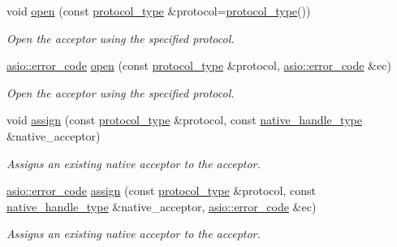 \begin{DoxyCompactItemize}
void \hyperlink{classasio_1_1basic__socket__acceptor_a8482fb8ffe099526567a721f027dacf0}{open} (const \hyperlink{classasio_1_1basic__socket__acceptor_a38f40022b2596eb88875792bd6c0fb21}{protocol\+\_\+type} \&protocol=\hyperlink{classasio_1_1basic__socket__acceptor_a38f40022b2596eb88875792bd6c0fb21}{protocol\+\_\+type}())
\begin{DoxyCompactList}\small\item\em Open the acceptor using the specified protocol. \end{DoxyCompactList}\item 
\hyperlink{classasio_1_1error__code}{asio\+::error\+\_\+code} \hyperlink{classasio_1_1basic__socket__acceptor_ab661d709895470380e3dab3601e5fb64}{open} (const \hyperlink{classasio_1_1basic__socket__acceptor_a38f40022b2596eb88875792bd6c0fb21}{protocol\+\_\+type} \&protocol, \hyperlink{classasio_1_1error__code}{asio\+::error\+\_\+code} \&ec)
\begin{DoxyCompactList}\small\item\em Open the acceptor using the specified protocol. \end{DoxyCompactList}\item 
void \hyperlink{classasio_1_1basic__socket__acceptor_a60c3f6c7c06f56080e6d56532a48c4c0}{assign} (const \hyperlink{classasio_1_1basic__socket__acceptor_a38f40022b2596eb88875792bd6c0fb21}{protocol\+\_\+type} \&protocol, const \hyperlink{classasio_1_1basic__socket__acceptor_a6b3afaaad5c55272803ad5b911a00d35}{native\+\_\+handle\+\_\+type} \&native\+\_\+acceptor)
\begin{DoxyCompactList}\small\item\em Assigns an existing native acceptor to the acceptor. \end{DoxyCompactList}\item 
\hyperlink{classasio_1_1error__code}{asio\+::error\+\_\+code} \hyperlink{classasio_1_1basic__socket__acceptor_ab3f39e7f7e36b98cc158f92bad40b5f1}{assign} (const \hyperlink{classasio_1_1basic__socket__acceptor_a38f40022b2596eb88875792bd6c0fb21}{protocol\+\_\+type} \&protocol, const \hyperlink{classasio_1_1basic__socket__acceptor_a6b3afaaad5c55272803ad5b911a00d35}{native\+\_\+handle\+\_\+type} \&native\+\_\+acceptor, \hyperlink{classasio_1_1error__code}{asio\+::error\+\_\+code} \&ec)
\begin{DoxyCompactList}\small\item\em Assigns an existing native acceptor to the acceptor. \end{DoxyCompactList}\item 

\end{DoxyCompactItemize}
